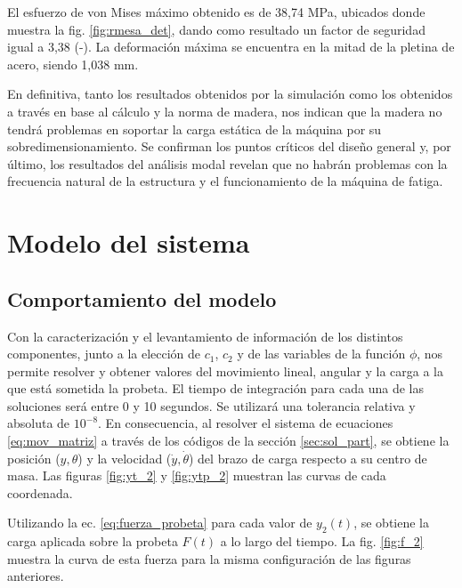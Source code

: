 El esfuerzo de von Mises máximo obtenido es de 38,74 MPa, ubicados donde muestra la fig. \ref{fig:rmesa_det}, dando como resultado un factor de seguridad igual a 3,38 (-). La deformación máxima se encuentra en la mitad de la pletina de acero, siendo 1,038 mm.

En definitiva, tanto los resultados obtenidos por la simulación como los obtenidos a través en base al cálculo y la norma de madera, nos indican que la madera no tendrá problemas en soportar la carga estática de la máquina por su sobredimensionamiento. Se confirman los puntos críticos del diseño general y, por último, los resultados del análisis modal revelan que no habrán problemas con la frecuencia natural de la estructura y el funcionamiento de la máquina de fatiga.

\section{Modelo del sistema}

\subsection{Comportamiento del modelo}
Con la caracterización y el levantamiento de información de los distintos componentes, junto a la elección de $c_1$, $c_2$ y de las variables de la función $\phi$, nos permite resolver y obtener valores del movimiento lineal, angular y la carga a la que está sometida la probeta. El tiempo de integración para cada una de las soluciones será entre 0 y 10 segundos. Se utilizará una tolerancia relativa y absoluta de $10^{-8}$. En consecuencia, al resolver el sistema de ecuaciones \ref{eq:mov_matriz} a través de los códigos de la sección \ref{sec:sol_part}, se obtiene la posición ($y,\theta$) y la velocidad ($\dot{y},\dot{\theta}$) del brazo de carga respecto a su centro de masa. Las figuras \ref{fig:yt_2} y \ref{fig:ytp_2} muestran las curvas de cada coordenada.

Utilizando la ec. \ref{eq:fuerza_probeta} para cada valor de $y_2(t)$, se obtiene la carga aplicada sobre la probeta $F(t)$ a lo largo del tiempo. La fig. \ref{fig:f_2} muestra la curva de esta fuerza para la misma configuración de las figuras anteriores.  

